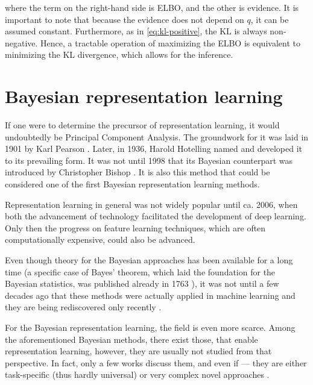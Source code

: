 \noindent where the term on the right-hand side is ELBO, and the other is evidence. It is important to note that because the evidence does not depend on $q$, it can be assumed constant. Furthermore, as in \autoref{eq:kl-positive}, the KL is always non-negative. Hence, a tractable operation of maximizing the ELBO is equivalent to minimizing the KL divergence, which allows for the inference.





\vspace{\baselineskip}
\section{Bayesian representation learning}\label{sec:related-work}
If one were to determine the precursor of representation learning, it would undoubtedly be Principal Component Analysis. The groundwork for it was laid in 1901 by Karl Pearson \cite{Pearson1901}. Later, in 1936, Harold Hotelling \cite{Hotelling1936} named and developed it to its prevailing form. It was not until 1998 that its Bayesian counterpart was introduced by Christopher Bishop \cite{Bishop1998}. It is also this method that could be considered one of the first Bayesian representation learning methods.

\vspace{\baselineskip}
Representation learning in general was not widely popular until ca. 2006, when both the advancement of technology facilitated the development of deep learning. Only then the progress on feature learning techniques, which are often computationally expensive, could also be advanced.

\vspace{\baselineskip}
Even though theory for the Bayesian approaches has been available for a long time (a specific case of Bayes' theorem, which laid the foundation for the Bayesian statistics, was published already in 1763 \cite{Bayes1763}), it was not until a few decades ago that these methods were actually applied in machine learning \cite{Bishop1998, MacKay1992, Mackay1995} and they are being rediscovered only recently \cite{Jospin2022, Blundell2015, Wilson2020, Kingma2015, Chen2012, Gal2016, Kingma2014, Wang2018}.

\vspace{\baselineskip}
For the Bayesian representation learning, the field is even more scarce. Among the aforementioned Bayesian methods, there exist those, that enable representation learning, however, they are usually not studied from that perspective. In fact, only a few works discuss them, and even if — they are either task-specific (thus hardly universal) or very complex novel approaches \cite{Nozawa2020, Meng2021, Barkan2021, Zavatone2021}. 
